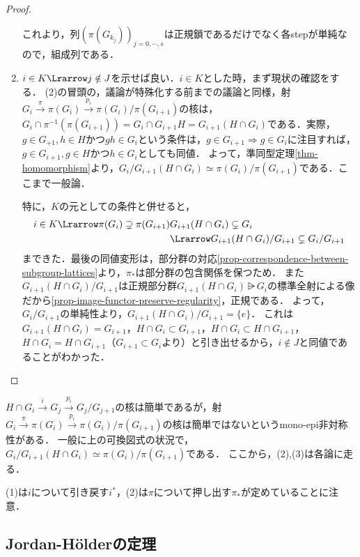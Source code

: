 \documentclass[uplatex,dvipdfmx]{jsreport}
\begin{document}
\begin{proof}
\begin{enumerate}
        これより，列$(\pi(G_{k_j}))_{j=0,\cdots,s}$は正規鎖であるだけでなく各stepが単純なので，組成列である．
        \item $i\in K\Lrarrow j\notin J$を示せば良い．$i\in K$とした時，まず現状の確認をする．
        (2)の冒頭の，議論が特殊化する前までの議論と同様，射$G_i\xrightarrow{\pi}\pi(G_i)\xrightarrow{p_i}\pi(G_i)/\pi(G_{i+1})$の核は，
        $G_i\cap\pi^{-1}(\pi(G_{i+1}))=G_i\cap G_{i+1}H=G_{i+1}(H\cap G_i)$である．実際，$g\in G_{+1},h\in H$かつ$gh\in G_i$という条件は，$g\in G_{i+1}\Rightarrow g\in G_i$に注目すれば，$g\in G_{i+1},g\in H$かつ$h\in G_i$としても同値．
        よって，準同型定理\ref{thm-homomorphism}より，$G_i/G_{i+1}(H\cap G_i)\simeq\pi(G_i)/\pi(G_{i+1})$である．ここまで一般論．

        特に，$K$の元としての条件と併せると，
        \begin{align*}
            i\in K\Lrarrow \pi(G_i)\supsetneq\pi(G_{i+1})&G_{i+1}(H\cap G_i)\subsetneq G_i\\
            &\Lrarrow G_{i+1}(H\cap G_i)/G_{i+1}\subsetneq G_i/G_{i+1}
        \end{align*}
        まできた．最後の同値変形は，部分群の対応\ref{prop-correspondence-between-subgroup-lattices}より，$\pi_*$は部分群の包含関係を保つため．
        また$G_{i+1}(H\cap G_i)/G_{i+1}$は正規部分群$G_{i+1}(H\cap G_i)\rsub G_i$の標準全射による像だから\ref{prop-image-functor-preserve-regularity}，正規である．
        よって，$G_i/G_{i+1}$の単純性より，$G_{i+1}(H\cap G_i)/G_{i+1}=\{e\}$．
        これは$G_{i+1}(H\cap G_i)=G_{i+1}$，$H\cap G_i\subset G_{i+1}$，$H\cap G_i\subset H\cap G_{i+1}$，$H\cap G_i=H\cap G_{i+1}$（$G_{i+1}\subset G_i$より）と引き出せるから，$i\notin J$と同値であることがわかった．
    \end{enumerate}
\end{proof}
\begin{remarks}
    $H\cap G_i\xrightarrow{i}G_j\xrightarrow{p_i}G_j/G_{j+1}$の核は簡単であるが，射$G_i\xrightarrow{\pi}\pi(G_i)\xrightarrow{p_i}\pi(G_i)/\pi(G_{i+1})$の核は簡単ではないというmono-epi非対称性がある．
    一般に上の可換図式の状況で，$G_i/G_{i+1}(H\cap G_i)\simeq\pi(G_i)/\pi(G_{i+1})$である．
    ここから，(2),(3)は各論に走る．

    (1)は$i$について引き戻す$i^*$，(2)は$\pi$について押し出す$\pi_*$が定めていることに注意．
\end{remarks}

\subsection{Jordan-Hölderの定理}
\end{document}
